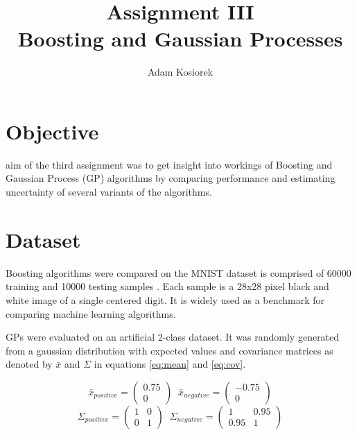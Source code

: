 \documentclass[journal, a4paper]{IEEEtran}
\begin{document}
	\title{Assignment III\\Boosting and Gaussian Processes}
	\author{Adam Kosiorek}	
	\maketitle
	
	
\section{Objective}
     aim of the third assignment was to get insight into workings of Boosting and Gaussian Process (GP) algorithms by comparing performance and estimating uncertainty of several variants of the algorithms.
    
\section{Dataset}
    Boosting algorithms were compared on the MNIST dataset is comprised of 60000 training and 10000 testing samples \cite{MNIST}. Each sample is a 28x28 pixel black and white image of a single centered digit. It is widely used as a benchmark for comparing machine learning algorithms. 
    
    GPs were evaluated on an artificial 2-class dataset. It was randomly generated from a gaussian distribution with expected values and covariance matrices as denoted by $\bar{x}$ and $\Sigma$ in equations \ref{eq:mean} and \ref{eq:cov}.
    
    \begin{equation}
     \bar{x}_{positive} = \begin{pmatrix} 0.75 \\ 0 \end{pmatrix} \;\; 
     \bar{x}_{negative} = \begin{pmatrix} -0.75 \\ 0 \end{pmatrix}
     \label{eq:mean}
    \end{equation}
    \begin{equation}
     \Sigma_{positive} = \begin{pmatrix} 1 & 0 \\ 0 & 1 \end{pmatrix} \;\; 
     \Sigma_{negative} = \begin{pmatrix} 1 & 0.95 \\ 0.95 & 1 \end{pmatrix}
     \label{eq:cov}
    \end{equation}
\end{document}
